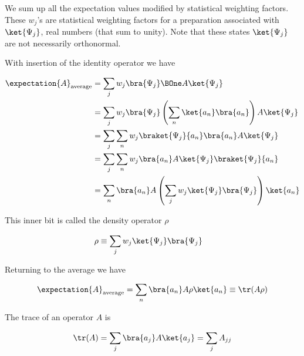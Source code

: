 We sum up all the expectation values modified by statistical weighting factors.  These \(w_j\)'s are statistical weighting factors for a preparation associated with \(\ket{\Psi_j}\), real numbers (that sum to unity).  Note that these states \(\ket{\Psi_j}\) are not necessarily orthonormal.

With insertion of the identity operator we have

\begin{equation}\label{eqn:lecture8makingSenseOfQM:1100}
\begin{aligned}
\expectation{A}_{\text{average}}
&= \sum_j w_j \bra{\Psi_j} \BOne A \ket{\Psi_j} \\
&= \sum_j w_j \bra{\Psi_j} \left( \sum_n \ket{a_n} \bra{a_n} \right) A \ket{\Psi_j} \\
&= \sum_j \sum_n w_j \braket{\Psi_j}{a_n} \bra{a_n} A \ket{\Psi_j} \\
&= \sum_j \sum_n w_j \bra{a_n} A \ket{\Psi_j} \braket{\Psi_j}{a_n}  \\
&= \sum_n \bra{a_n} A \left( \sum_j w_j \ket{\Psi_j} \bra{\Psi_j} \right) \ket{a_n}  \\
\end{aligned}
\end{equation}

This inner bit is called the density operator \(\rho\)

\begin{equation}\label{eqn:PHY356HNov2:40}
\begin{aligned}
\rho &\equiv \sum_j w_j \ket{\Psi_j} \bra{\Psi_j}
\end{aligned}
\end{equation}

Returning to the average we have

\begin{equation}\label{eqn:PHY356HNov2:50}
\begin{aligned}
\expectation{A}_{\text{average}} = \sum_n \bra{a_n} A \rho \ket{a_n} \equiv \tr(A \rho)
\end{aligned}
\end{equation}

The trace of an operator \(A\) is

\begin{equation}\label{eqn:PHY356HNov2:60}
\begin{aligned}
\tr(A) = \sum_j \bra{a_j} A \ket{a_j} = \sum_j A_{jj}
\end{aligned}
\end{equation}

